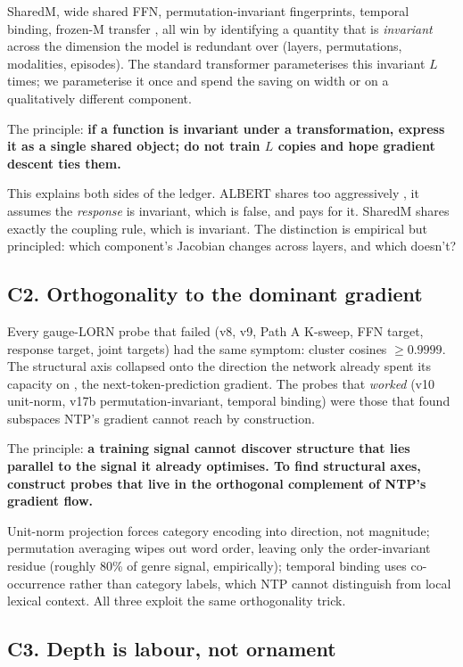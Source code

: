\documentclass[11pt, a4paper]{article}
\begin{document}
SharedM, wide shared FFN, permutation-invariant fingerprints, temporal binding, frozen-M transfer ,  all win by identifying a quantity that is \emph{invariant} across the dimension the model is redundant over (layers, permutations, modalities, episodes). The standard transformer parameterises this invariant $L$ times; we parameterise it once and spend the saving on width or on a qualitatively different component.

The principle: \textbf{if a function is invariant under a transformation, express it as a single shared object; do not train $L$ copies and hope gradient descent ties them.}

This explains both sides of the ledger. ALBERT shares too aggressively ,  it assumes the \emph{response} is invariant, which is false, and pays for it. SharedM shares exactly the coupling rule, which is invariant. The distinction is empirical but principled: which component's Jacobian changes across layers, and which doesn't?

\subsection{C2. Orthogonality to the dominant gradient}

Every gauge-LORN probe that failed (v8, v9, Path A K-sweep, FFN target, response target, joint targets) had the same symptom: cluster cosines $\geq 0.9999$. The structural axis collapsed onto the direction the network already spent its capacity on ,  the next-token-prediction gradient. The probes that \emph{worked} (v10 unit-norm, v17b permutation-invariant, temporal binding) were those that found subspaces NTP's gradient cannot reach by construction.

The principle: \textbf{a training signal cannot discover structure that lies parallel to the signal it already optimises. To find structural axes, construct probes that live in the orthogonal complement of NTP's gradient flow.}

Unit-norm projection forces category encoding into direction, not magnitude; permutation averaging wipes out word order, leaving only the order-invariant residue (roughly 80\% of genre signal, empirically); temporal binding uses co-occurrence rather than category labels, which NTP cannot distinguish from local lexical context. All three exploit the same orthogonality trick.

\subsection{C3. Depth is labour, not ornament}
\end{document}
